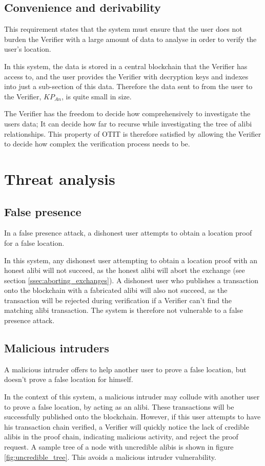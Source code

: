 \subsection{Convenience and derivability}
This requirement states that the system must ensure that the user does not burden the Verifier with a large amount of data to analyse in order to verify the user's location.

In this system, the data is stored in a central blockchain that the Verifier has access to, and the user provides the Verifier  with decryption keys and indexes into just a sub-section of this data. Therefore the data sent to from the user to the Verifier, $KP_{An}$, is quite small in size.

The Verifier has the freedom to decide how comprehensively to investigate the users data; It can decide how far to recurse while investigating the tree of alibi relationships. This property of OTIT is therefore satisfied by allowing the Verifier to decide how complex the verification process needs to be.

\section{Threat analysis}
\subsection{False presence}
In a false presence attack, a dishonest user attempts to obtain a location proof for a false location.

In this system, any dishonest user attempting to obtain a location proof with an honest alibi will not succeed, as the honest alibi will abort the exchange (see section \ref{ssec:aborting_exchanges}). A dishonest user who publishes a transaction onto the blockchain with a fabricated alibi will also not succeed, as the transaction will be rejected during verification if a Verifier can't find the matching alibi transaction. The system is therefore not vulnerable to a false presence attack.

\subsection{Malicious intruders}
A malicious intruder offers to help another user to prove a false location, but doesn't prove a false location for himself.

In the context of this system, a malicious intruder may collude with another user to prove a false location, by acting as an alibi. These transactions will be successfully published onto the blockchain. However, if this user attempts to have his transaction chain verified, a Verifier will quickly notice the lack of credible alibis in the proof chain, indicating malicious activity, and reject the proof request. A sample tree of a node with uncredible alibis is shown in figure \ref{fig:uncredible_tree}. This avoids a malicious intruder vulnerability.

